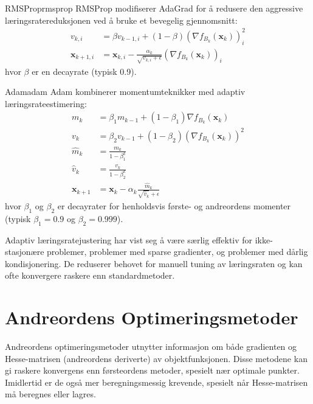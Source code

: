 \begin{definition}{RMSProp}{rmsprop}
	RMSProp modifiserer AdaGrad for å redusere den aggressive læringsratereduksjonen ved å bruke et bevegelig gjennomsnitt:
	\[
		\begin{aligned}
			v_{k,i}           & = \beta v_{k-1,i} + (1 - \beta) (\nabla f_{B_k}(\symbf{x}_k))_i^2                              \\
			\symbf{x}_{k+1,i} & = \symbf{x}_{k,i} - \frac{\alpha_k}{\sqrt{v_{k,i} + \epsilon}} (\nabla f_{B_k}(\symbf{x}_k))_i
		\end{aligned}
	\]
	hvor \(\beta\) er en decayrate (typisk 0.9).
\end{definition}

\begin{definition}{Adam}{adam}
	Adam kombinerer momentumteknikker med adaptiv læringsrateestimering:
	\[
		\begin{aligned}
			m_k             & = \beta_1 m_{k-1} + (1 - \beta_1) \nabla f_{B_k}(\symbf{x}_k)          \\
			v_k             & = \beta_2 v_{k-1} + (1 - \beta_2) (\nabla f_{B_k}(\symbf{x}_k))^2      \\
			\hat{m}_k       & = \frac{m_k}{1 - \beta_1^k}                                            \\
			\hat{v}_k       & = \frac{v_k}{1 - \beta_2^k}                                            \\
			\symbf{x}_{k+1} & = \symbf{x}_k - \alpha_k \frac{\hat{m}_k}{\sqrt{\hat{v}_k} + \epsilon}
		\end{aligned}
	\]
	hvor \(\beta_1\) og \(\beta_2\) er decayrater for henholdsvis første- og andreordens momenter (typisk \(\beta_1 = 0.9\) og \(\beta_2 = 0.999\)).
\end{definition}

Adaptiv læringsratejustering har vist seg å være særlig effektiv for ikke-stasjonære problemer, problemer med sparse gradienter, og problemer med dårlig kondisjonering. De reduserer behovet for manuell tuning av læringsraten og kan ofte konvergere raskere enn standardmetoder.

\chapter{Andreordens Optimeringsmetoder}
\label{chap:second_order_methods}

Andreordens optimeringsmetoder utnytter informasjon om både gradienten og Hesse-matrisen (andreordens deriverte) av objektfunksjonen.
Disse metodene kan gi raskere konvergens enn førsteordens metoder, spesielt nær optimale punkter.
Imidlertid er de også mer beregningsmessig krevende, spesielt når Hesse-matrisen må beregnes eller lagres.

